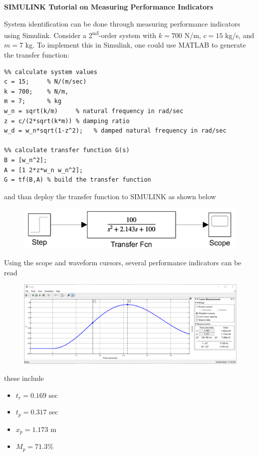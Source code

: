 \documentclass[12pt,letter]{article}
\begin{document}
\begin{example}

\textbf{SIMULINK Tutorial on Measuring Performance Indicators}

System identification can be done through measuring performance indicators using Simulink. Consider a 2\textsuperscript{nd}-order system with $k=700$ N/m, $c=15$ kg/s, and $m=7$ kg. To implement this in Simulink, one could use MATLAB to generate the transfer function:

\lstset{linewidth=5.8in}
\begin{minipage}{1\textwidth}
  \begin{center}
\begin{lstlisting}
%% calculate system values
c = 15;     % N/(m/sec)
k = 700;    % N/m,
m = 7;      % kg
w_n = sqrt(k/m)     % natural frequency in rad/sec
z = c/(2*sqrt(k*m)) % damping ratio
w_d = w_n*sqrt(1-z^2);   % damped natural frequency in rad/sec

%% calculate transfer function G(s)
B = [w_n^2];
A = [1 2*z*w_n w_n^2];
G = tf(B,A) % build the transfer function
\end{lstlisting}
  \end{center}
\end{minipage}

and than deploy the transfer function to SIMULINK as shown below
\begin{figure}[H]
	\centering
	\includegraphics[width=4.5in]{../figures/Simulink_step_model_transfer_2nd_oder_2}
\end{figure}

Using the scope and waveform cursors, several performance indicators can be read
\begin{figure}[H]
	\centering
	\includegraphics[width=6.0in]{../figures/Simulink_step_model_transfer_cursor_measurements_2nd_oder_2}
\end{figure}
these include
\begin{itemize}
\item $t_r = 0.169$ sec
\item $t_p = 0.317$ sec
\item $x_p = 1.173$ m
\item $M_p = 71.3\%$
\end{itemize}


\end{example}
\end{document}

